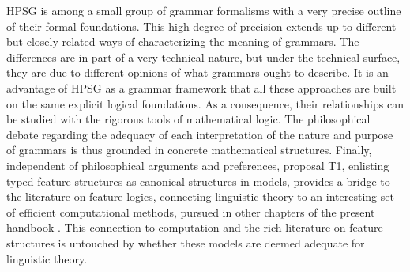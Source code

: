 \documentclass[output=paper
 	        ,biblatex
                ,babelshorthands
                ,newtxmath
                ,draftmode
                ,colorlinks, citecolor=brown
]{langscibook}
\begin{document}
{HPSG is among a small group of grammar formalisms with a very precise
outline of their formal foundations. This high degree of precision
extends up to different but closely related ways of characterizing the
meaning of grammars. The differences are in part of a very technical nature,
but under the technical surface, they are due to different opinions of
what grammars ought to describe. It is an advantage of HPSG as a
grammar framework that all these approaches are built on the same
explicit logical foundations. As a consequence, their relationships can
be studied with the rigorous tools of mathematical logic. The
philosophical debate regarding the adequacy of each interpretation of
the nature and purpose of grammars is thus grounded in concrete
mathematical structures. Finally, independent of 
philosophical arguments and preferences, proposal T1, enlisting typed feature
structures as canonical structures in models, provides a bridge to the
literature on feature logics, connecting linguistic theory to an
interesting set of efficient computational methods, pursued in other
chapters of the present handbook . This connection
to computation and the rich literature on feature structures is untouched
by whether these models are deemed adequate for linguistic theory.




}




\end{document}
